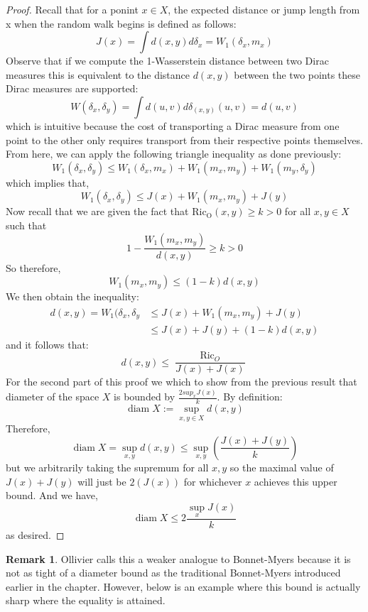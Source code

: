 \documentclass{Dissertate}
\theoremstyle{definition}
\theoremstyle{definition} %
\theoremstyle{definition}
\newtheorem{remark}[theorem]{Remark}
\begin{document}
\begin{proof}
Recall that for a ponint $x \in X$, the expected distance or jump length from x when the random walk begins is defined as follows:
$$
J(x) = \int d(x,y) d \delta_x = W_1(\delta_x, m_x)
$$
Observe that if we compute the 1-Wasserstein distance between two Dirac measures this is equivalent to the distance $d(x,y)$ between the two points these Dirac measures are supported: 
$$
W(\delta_x, \delta_y) = \int d(u,v) d \delta_{(x,y)}(u,v) = d(u,v)
$$
which is intuitive because the cost of transporting a Dirac measure from one point to the other only requires transport from their respective points themselves. From here, we can apply the following triangle inequality as done previously: 
$$
W_1(\delta_x, \delta_y) \leq W_1(\delta_x, m_x) + W_1(m_x, m_y) + W_1(m_y, \delta_y)
$$
which implies that, 
$$
W_1(\delta_x, \delta_y) \leq J(x) + W_1(m_x, m_y) + J(y)
$$
Now recall that we are given the fact that $\operatorname{Ric_O}(x, y) \geq k >0$ for all $x, y \in X$ such that 
$$
1 - \frac{W_1 (m_x, m_y)}{d(x,y)} \geq k >0
$$
So therefore, 
$$
W_1(m_x, m_y) \leq (1-k)d(x,y)
$$
We then obtain the inequality:
\begin{align*}
d(x,y) = W_1(\delta_x, \delta_y &\leq J(x) + W_1(m_x, m_y) + J(y)  \\ &\leq J(x) + J(y) + (1-k)d(x,y)
\end{align*}
and it follows that: 
$$
d(x,y) \leq \frac{\operatorname{Ric}_O}{J(x) + J(x)}
$$
For the second part of this proof we which to show from the previous result that diameter of the space $X$ is bounded by $\frac{2sup_x J(x)}{k}$. By definition: 
$$
\operatorname{diam}X := \operatorname{sup}_{x,y \in X} d(x,y)
$$
Therefore, 
$$
\operatorname{diam} X = \sup_{x, y} d(x, y)
\leq \sup_{x, y} \left( \frac{J(x) + J(y)}{k} \right)
$$
but we arbitrarily taking the supremum for all $x,y$ so the maximal value of $J(x) + J(y)$ will just be $2(J(x))$ for whichever $x$ achieves this upper bound. And we have, 
$$
\operatorname{diam} X \leq 2 \frac{\operatorname{sup}_x J(x)}{k}
$$
as desired. 
\end{proof}
\begin{remark}
Ollivier calls this a weaker analogue to Bonnet-Myers because it is not as tight of a diameter bound as the traditional Bonnet-Myers introduced earlier in the chapter. However, below is an example where this bound is actually sharp where the equality is attained. 
\end{remark}
\end{document}
